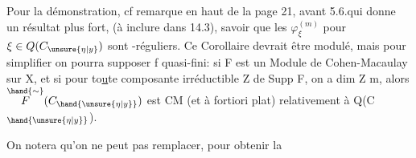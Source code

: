 Pour la démonstration, cf remarque en haut de la page 21, avant 5.6.qui donne un résultat plus fort, (à inclure dans 14.3), savoir que les $\varphi^{(m)}_{\xi}$ pour $\xi\in Q(C_{\unsure{\eta|y}})$ sont -réguliers.
Ce Corollaire devrait être modulé, mais pour simplifier on pourra
supposer f quasi-fini: si F est un Module de Cohen-Macaulay sur X, et si
pour to\uline{u}te composante irréductible Z de Supp F, on a dim Z \hand{$\geqslant$} m, alors
$\overset{\hand{\sim}}{F}(C_{\hand{\unsure{\eta|y}}})$ est CM (et à fortiori plat) relativement à Q(C$_{\hand{\unsure{\eta|y}}}$).

On notera qu'on ne peut pas remplacer, pour obtenir la

